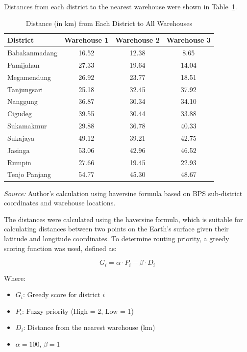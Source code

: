 \documentclass[journal,final,a4paper,twoside,11pt]{IEEEtran}
\begin{document}
Distances from each district to the nearest warehouse were shown in Table~\ref{tab:distance_matrix}.
\begin{table}[H]
\caption{Distance (in km) from Each District to All Warehouses}
\begin{center}
\begin{tabular}{|p{2cm}|c|c|c|}
\hline
\textbf{District} & \textbf{Warehouse 1} & \textbf{Warehouse 2} & \textbf{Warehouse 3} \\
\hline
Babakanmadang & 16.52 & 12.38 & 8.65 \\
\hline
Pamijahan & 27.33 & 19.64 & 14.04 \\
\hline
Megamendung & 26.92 & 23.77 & 18.51 \\
\hline
Tanjungsari & 25.18 & 32.45 & 37.92 \\
\hline
Nanggung & 36.87 & 30.34 & 34.10 \\
\hline
Cigudeg & 39.55 & 30.44 & 33.88 \\
\hline
Sukamakmur & 29.88 & 36.78 & 40.33 \\
\hline
Sukajaya & 49.12 & 39.21 & 42.75 \\
\hline
Jasinga & 53.06 & 42.96 & 46.52 \\
\hline
Rumpin & 27.66 & 19.45 & 22.93 \\
\hline
Tenjo Panjang & 54.77 & 45.30 & 48.67 \\
\hline
\end{tabular}
\vspace{0.2cm}

\footnotesize{\textit{Source:} Author’s calculation using haversine formula based on BPS sub-district coordinates and warehouse locations.}
\label{tab:distance_matrix}
\end{center}
\end{table}

The distances were calculated using the haversine formula, which is suitable for calculating distances between two points on the Earth's surface given their latitude and longitude coordinates. To determine routing priority, a greedy scoring function was used, defined as:

\begin{equation}
G_i = \alpha \cdot P_i - \beta \cdot D_i
\end{equation}

Where:
\begin{itemize}
    \item \( G_i \): Greedy score for district \( i \)
    \item \( P_i \): Fuzzy priority (High = 2, Low = 1)
    \item \( D_i \): Distance from the nearest warehouse (km)
    \item \( \alpha = 100 \), \( \beta = 1 \)
\end{itemize}
\end{document}
